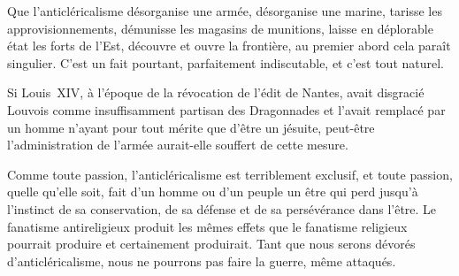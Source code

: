 \documentclass[french,twoside]{book} %
\newcommand{\astertri}{\medskip\par\centerline{\color{rubric}\large\selectfont{\syms ✻\,✻\,✻}}\medskip\par}%
\begin{document}
Que l’anticléricalisme désorganise une armée, désorganise une marine, tarisse les approvisionnements, démunisse les magasins de munitions, laisse en déplorable état les forts de l’Est, découvre et ouvre la frontière, au premier abord cela paraît singulier. C’est un fait pourtant, parfaitement indiscutable, et c’est tout naturel.\par
Si Louis XIV, à l’époque de la révocation de l’édit de Nantes, avait disgracié Louvois comme insuffisamment partisan des Dragonnades et l’avait remplacé par un homme n’ayant pour tout mérite que d’être un jésuite, peut-être l’administration de l’armée aurait-elle souffert de cette mesure.\par
Comme toute passion, l’anticléricalisme est terriblement exclusif, et toute passion, quelle qu’elle soit, fait d’un homme ou d’un peuple un être qui perd jusqu’à l’instinct de sa conservation, de sa défense et de sa persévérance dans l’être. Le fanatisme antireligieux produit les mêmes effets que le fanatisme religieux pourrait produire et certainement  produirait. Tant que nous serons dévorés d’anticléricalisme, nous ne pourrons pas faire la guerre, même attaqués.\par

\astertri
\end{document}
